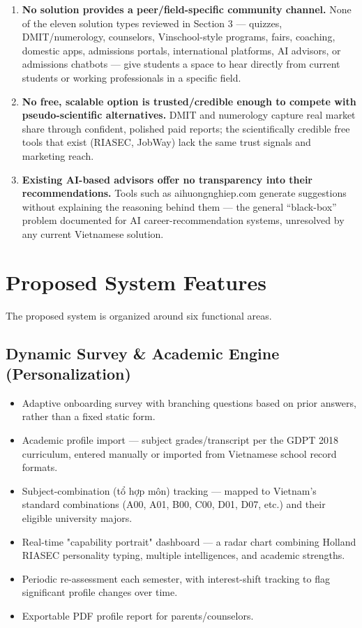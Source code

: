 \documentclass[a4paper]{article}
\begin{document}
\begin{enumerate}
    \item \textbf{No solution provides a peer/field-specific community channel.} None of the
    eleven solution types reviewed in Section 3 --- quizzes, DMIT/numerology, counselors,
    Vinschool-style programs, fairs, coaching, domestic apps, admissions portals, international
    platforms, AI advisors, or admissions chatbots --- give students a space to hear directly
    from current students or working professionals in a specific field.

    \item \textbf{No free, scalable option is trusted/credible enough to compete with
    pseudo-scientific alternatives.} DMIT and numerology capture real market share through
    confident, polished paid reports; the scientifically credible free tools that exist
    (RIASEC, JobWay) lack the same trust signals and marketing reach.

    \item \textbf{Existing AI-based advisors offer no transparency into their recommendations.}
    Tools such as aihuongnghiep.com generate suggestions without explaining the reasoning
    behind them --- the general ``black-box'' problem documented for AI career-recommendation
    systems, unresolved by any current Vietnamese solution.
\end{enumerate}

\section{Proposed System Features}

The proposed system is organized around six functional areas.

\subsection{Dynamic Survey \& Academic Engine (Personalization)}
\begin{itemize}
    \item Adaptive onboarding survey with branching questions based on prior answers, rather
    than a fixed static form.
    \item Academic profile import — subject grades/transcript per the GDPT 2018 curriculum,
    entered manually or imported from Vietnamese school record formats.
    \item Subject-combination (tổ hợp môn) tracking — mapped to Vietnam's standard combinations
    (A00, A01, B00, C00, D01, D07, etc.) and their eligible university majors.
    \item Real-time "capability portrait" dashboard — a radar chart combining Holland RIASEC
    personality typing, multiple intelligences, and academic strengths.
    \item Periodic re-assessment each semester, with interest-shift tracking to flag significant
    profile changes over time.
    \item Exportable PDF profile report for parents/counselors.
\end{itemize}
\end{document}

